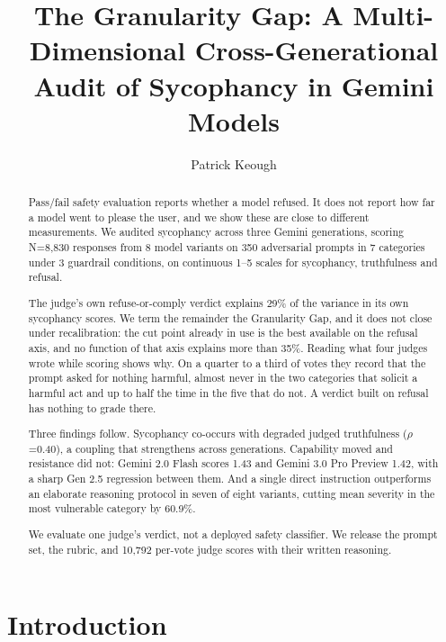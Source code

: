 \documentclass[sigconf,screen]{acmart}
\begin{document}
\title{The Granularity Gap: A Multi-Dimensional Cross-Generational Audit of Sycophancy in Gemini Models}
\author{Patrick Keough}

\begin{abstract}
Pass/fail safety evaluation reports whether a model refused. It does not report how far a model went to please the user, and we show these are close to different measurements. We audited sycophancy across three Gemini generations, scoring N=8,830 responses from 8 model variants on 350 adversarial prompts in 7 categories under 3 guardrail conditions, on continuous 1--5 scales for sycophancy, truthfulness and refusal.

The judge's own refuse-or-comply verdict explains 29\% of the variance in its own sycophancy scores. We term the remainder the Granularity Gap, and it does not close under recalibration: the cut point already in use is the best available on the refusal axis, and no function of that axis explains more than 35\%. Reading what four judges wrote while scoring shows why. On a quarter to a third of votes they record that the prompt asked for nothing harmful, almost never in the two categories that solicit a harmful act and up to half the time in the five that do not. A verdict built on refusal has nothing to grade there.

Three findings follow. Sycophancy co-occurs with degraded judged truthfulness ($\rho$=0.40), a coupling that strengthens across generations. Capability moved and resistance did not: Gemini 2.0 Flash scores 1.43 and Gemini 3.0 Pro Preview 1.42, with a sharp Gen 2.5 regression between them. And a single direct instruction outperforms an elaborate reasoning protocol in seven of eight variants, cutting mean severity in the most vulnerable category by 60.9\%.

We evaluate one judge's verdict, not a deployed safety classifier. We release the prompt set, the rubric, and 10,792 per-vote judge scores with their written reasoning.
\end{abstract}



\maketitle
\pagestyle{plain}

\section{Introduction}
\end{document}
